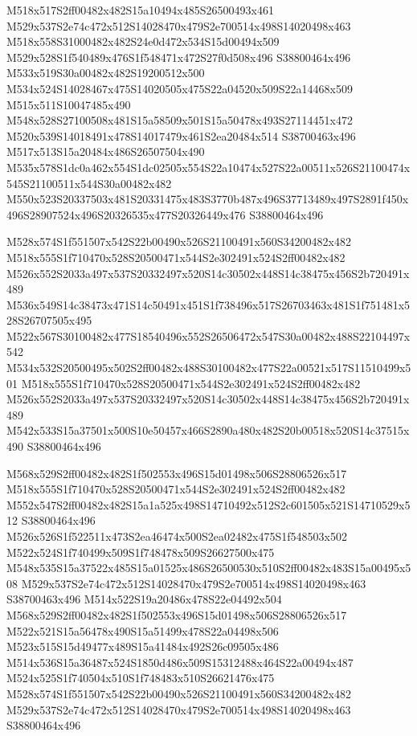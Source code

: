 \documentclass{article}
\begin{document}
\begin{multicols}{2}
M518x517S2ff00482x482S15a10494x485S26500493x461 M529x537S2e74c472x512S14028470x479S2e700514x498S14020498x463 M518x558S31000482x482S24e0d472x534S15d00494x509 M529x528S1f540489x476S1f548471x472S27f0d508x496 S38800464x496 M533x519S30a00482x482S19200512x500 M534x524S14028467x475S14020505x475S22a04520x509S22a14468x509 M515x511S10047485x490 M548x528S27100508x481S15a58509x501S15a50478x493S27114451x472 M520x539S14018491x478S14017479x461S2ea20484x514 S38700463x496 M517x513S15a20484x486S26507504x490 M535x578S1dc0a462x554S1dc02505x554S22a10474x527S22a00511x526S21100474x545S21100511x544S30a00482x482 M550x523S20337503x481S20331475x483S3770b487x496S37713489x497S2891f450x496S28907524x496S20326535x477S20326449x476 S38800464x496

M528x574S1f551507x542S22b00490x526S21100491x560S34200482x482 M518x555S1f710470x528S20500471x544S2e302491x524S2ff00482x482 M526x552S2033a497x537S20332497x520S14c30502x448S14c38475x456S2b720491x489 M536x549S14c38473x471S14c50491x451S1f738496x517S26703463x481S1f751481x528S26707505x495 M522x567S30100482x477S18540496x552S26506472x547S30a00482x488S22104497x542 M534x532S20500495x502S2ff00482x488S30100482x477S22a00521x517S11510499x501 M518x555S1f710470x528S20500471x544S2e302491x524S2ff00482x482 M526x552S2033a497x537S20332497x520S14c30502x448S14c38475x456S2b720491x489 M542x533S15a37501x500S10e50457x466S2890a480x482S20b00518x520S14c37515x490 S38800464x496

M568x529S2ff00482x482S1f502553x496S15d01498x506S28806526x517 M518x555S1f710470x528S20500471x544S2e302491x524S2ff00482x482 M552x547S2ff00482x482S15a1a525x498S14710492x512S2c601505x521S14710529x512 S38800464x496 M526x526S1f522511x473S2ea46474x500S2ea02482x475S1f548503x502 M522x524S1f740499x509S1f748478x509S26627500x475 M548x535S15a37522x485S15a01525x486S26500530x510S2ff00482x483S15a00495x508 M529x537S2e74c472x512S14028470x479S2e700514x498S14020498x463 S38700463x496 M514x522S19a20486x478S22e04492x504 M568x529S2ff00482x482S1f502553x496S15d01498x506S28806526x517 M522x521S15a56478x490S15a51499x478S22a04498x506 M523x515S15d49477x489S15a41484x492S26c09505x486 M514x536S15a36487x524S1850d486x509S15312488x464S22a00494x487 M524x525S1f740504x510S1f748483x510S26621476x475 M528x574S1f551507x542S22b00490x526S21100491x560S34200482x482 M529x537S2e74c472x512S14028470x479S2e700514x498S14020498x463 S38800464x496


\end{multicols}
\end{document}
